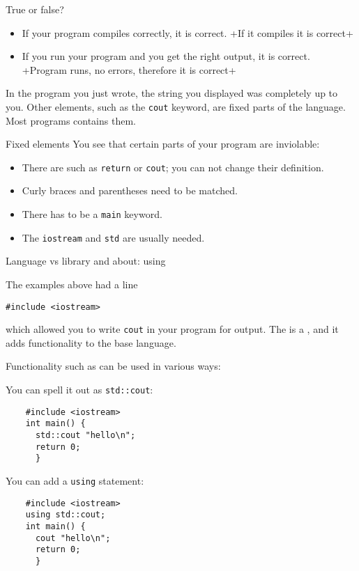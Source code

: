 \begin{review}
  \label{q:compile}
  True or false?
  \begin{itemize}
  \item If your program compiles correctly, it is correct.
    \slackpollTF+If it compiles it is correct+
  \item If you run your program and you get the right output, it is correct.
    \slackpollTF+Program runs, no errors, therefore it is correct+
  \end{itemize}  
\end{review}

In the program you just wrote, the string you displayed
was completely up to you. Other elements, such as the \lstinline{cout}
keyword, are fixed parts of the language.
Most programs contains them.

\begin{block}{Fixed elements}
  \label{sl:fixedstuff}
  You see that certain parts of your program are inviolable:
  \begin{itemize}
  \item There are  such as \lstinline{return} or \lstinline{cout}; you
    can not change their definition.
  \item Curly braces and parentheses need to be matched.
  \item There has to be a \lstinline{main} keyword.
  \item The \lstinline{iostream} and \lstinline{std} are usually needed.
  \end{itemize}
\end{block}

 {Language vs library and about: using}
\label{sec:usingio}

The examples above had a line
\begin{lstlisting}
#include <iostream>
\end{lstlisting}
which allowed you to write \lstinline{cout} in your program
for output.
The  is a ,
and it adds 
functionality to the base language.

Functionality such as  can be used in various ways:
\begin{multicols}{2}
  You can spell it out as \lstinline+std::cout+:
  \begin{lstlisting}
    #include <iostream>
    int main() {
      std::cout "hello\n";
      return 0;
      }
  \end{lstlisting}
  \columnbreak
  You can add a \lstinline{using} statement:
  \begin{lstlisting}
    #include <iostream>
    using std::cout;
    int main() {
      cout "hello\n";
      return 0;
      }
  \end{lstlisting}
\end{multicols}

